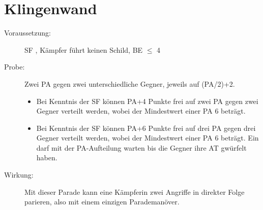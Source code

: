 \section{Klingenwand}
\label{reaktion.klingenwand}
\begin{description}
    \item[Voraussetzung:] SF , Kämpfer führt keinen Schild, BE\textrm{ ${\leq}$ }4
    \item[Probe:]
        Zwei PA gegen zwei unterschiedliche Gegner, jeweils auf (PA/2)+2.
        \begin{itemize}
            \item Bei Kenntnis der SF  können PA+4 Punkte frei auf zwei PA gegen zwei Gegner verteilt werden, wobei der Mindestwert einer PA 6 beträgt.
            \item Bei Kenntnis der SF  können PA+6 Punkte frei auf drei PA gegen drei Gegner verteilt werden, wobei der Mindestwert einer PA 6 beträgt.
            Ein  darf mit der PA-Aufteilung warten bis die Gegner ihre AT gwürfelt haben.
        \end{itemize}
    \item[Wirkung:]
        Mit dieser Parade kann eine Kämpferin zwei Angriffe in direkter Folge parieren, also mit einem einzigen Parademanöver.
\end{description}
